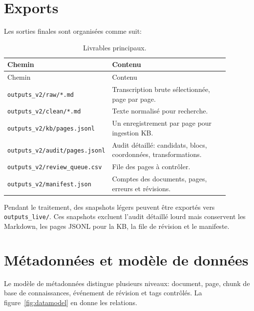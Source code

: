 \documentclass[11pt,a4paper]{article}
\begin{document}
\section{Exports}

Les sorties finales sont organisées comme suit:

\begin{longtable}{p{0.35\linewidth}p{0.55\linewidth}}
\caption{Livrables principaux.}\\
\toprule
Chemin & Contenu \\
\midrule
\endfirsthead
\toprule
Chemin & Contenu \\
\midrule
\endhead
\texttt{outputs\_v2/raw/*.md} & Transcription brute sélectionnée, page par page. \\
\texttt{outputs\_v2/clean/*.md} & Texte normalisé pour recherche. \\
\texttt{outputs\_v2/kb/pages.jsonl} & Un enregistrement par page pour ingestion KB. \\
\texttt{outputs\_v2/audit/pages.jsonl} & Audit détaillé: candidats, blocs, coordonnées, transformations. \\
\texttt{outputs\_v2/review\_queue.csv} & File des pages à contrôler. \\
\texttt{outputs\_v2/manifest.json} & Comptes des documents, pages, erreurs et révisions. \\
\bottomrule
\end{longtable}

Pendant le traitement, des snapshots légers peuvent être exportés vers \texttt{outputs\_live/}. Ces snapshots excluent l'audit détaillé lourd mais conservent les Markdown, les pages JSONL pour la KB, la file de révision et le manifeste.

\section{Métadonnées et modèle de données}

Le modèle de métadonnées distingue plusieurs niveaux: document, page, chunk de base de connaissances, événement de révision et tags contrôlés. La figure~\ref{fig:datamodel} en donne les relations.
\end{document}

